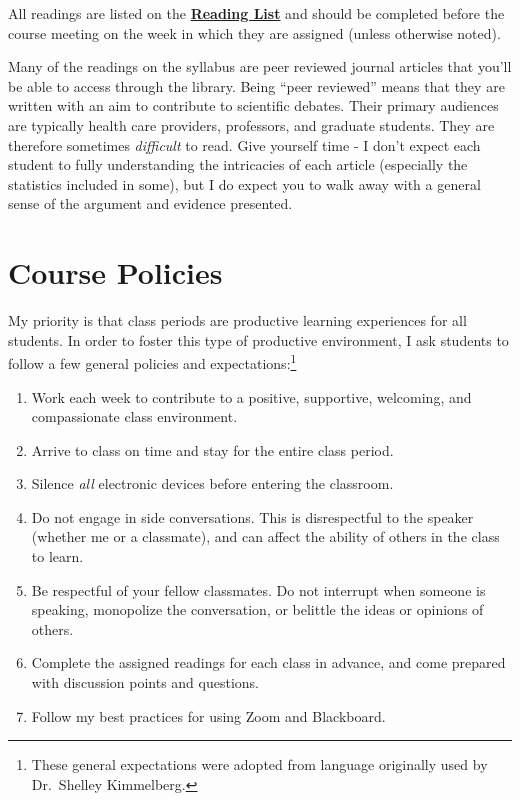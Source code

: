 \documentclass[
]{book}
\providecommand{\tightlist}{%
  \setlength{\itemsep}{0pt}\setlength{\parskip}{0pt}}
\begin{document}
All readings are listed on the \href{/syllabus/lecture-schedule.html}{\textbf{Reading List}} and should be completed before the course meeting on the week in which they are assigned (unless otherwise noted).

Many of the readings on the syllabus are peer reviewed journal articles that you'll be able to access through the library. Being ``peer reviewed'' means that they are written with an aim to contribute to scientific debates. Their primary audiences are typically health care providers, professors, and graduate students. They are therefore sometimes \emph{difficult} to read. Give yourself time - I don't expect each student to fully understanding the intricacies of each article (especially the statistics included in some), but I do expect you to walk away with a general sense of the argument and evidence presented.

\hypertarget{course-policies}{%
\chapter{Course Policies}\label{course-policies}}

My priority is that class periods are productive learning experiences for all students. In order to foster this type of productive environment, I ask students to follow a few general policies and expectations:\footnote{These general expectations were adopted from language originally used by Dr.~Shelley Kimmelberg.}

\begin{enumerate}
\def\labelenumi{\arabic{enumi}.}
\tightlist
\item
  Work each week to contribute to a positive, supportive, welcoming, and compassionate class environment.
\item
  Arrive to class on time and stay for the entire class period.
\item
  Silence \emph{all} electronic devices before entering the classroom.
\item
  Do not engage in side conversations. This is disrespectful to the speaker (whether me or a classmate), and can affect the ability of others in the class to learn.
\item
  Be respectful of your fellow classmates. Do not interrupt when someone is speaking, monopolize the conversation, or belittle the ideas or opinions of others.
\item
  Complete the assigned readings for each class in advance, and come prepared with discussion points and questions.
\item
  Follow my best practices for using Zoom and Blackboard.
\end{enumerate}
\end{document}
